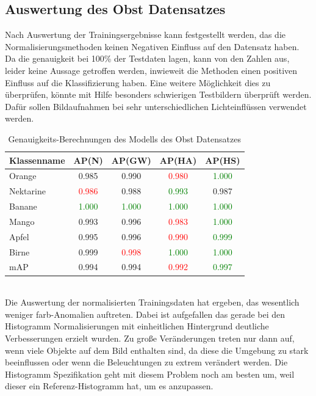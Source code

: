 \documentclass[a4paper,12pt,oneside]{article}
\begin{document}
\subsection{Auswertung des Obst Datensatzes}
Nach Auswertung der Trainingsergebnisse kann festgestellt werden, das die Normalisierungsmethoden keinen Negativen Einfluss auf den Datensatz haben. Da die genauigkeit bei 100\% der Testdaten lagen, kann von den Zahlen aus, leider keine Aussage getroffen werden, inwieweit die Methoden einen positiven Einfluss auf die Klassifizierung haben. Eine weitere Möglichkeit dies zu überprüfen, könnte mit Hilfe besonders schwierigen Testbildern überprüft werden. Dafür sollen Bildaufnahmen bei sehr unterschiedlichen Lichteinflüssen verwendet werden.
\begin{table}
[h]
\caption{Genauigkeits-Berechnungen des Modells des Obst Datensatzes}
\centering
\begin{tabular}{|l|c|c|c|c|}
\hline
Klassenname & AP(N) & AP(GW) & AP(HA) & AP(HS)\\
\hline
Orange & 0.985 & 0.990 & \textcolor{red}{0.980} & \textcolor{green}{1.000}\\
Nektarine & \textcolor{red}{0.986} & 0.988 & \textcolor{green}{0.993} & 0.987\\
Banane & \textcolor{green}{1.000} & \textcolor{green}{1.000} & \textcolor{green}{1.000} & \textcolor{green}{1.000}\\
Mango & 0.993 & 0.996 & \textcolor{red}{0.983} & \textcolor{green}{1.000}\\
Apfel & 0.995 & 0.996 & \textcolor{red}{0.990} & \textcolor{green}{0.999}\\
Birne & 0.999 & \textcolor{red}{0.998} & \textcolor{green}{1.000} & \textcolor{green}{1.000}\\
\hline
mAP & 0.994 & 0.994 & \textcolor{red}{0.992} & \textcolor{green}{0.997}\\
\hline
\end{tabular}
\end{table}\\
Die Auswertung der normalisierten Trainingsdaten hat ergeben, das wesentlich weniger farb-Anomalien auftreten. Dabei ist aufgefallen das gerade bei den Histogramm Normalisierungen mit einheitlichen Hintergrund deutliche Verbesserungen erzielt wurden. Zu große Veränderungen treten nur dann auf, wenn viele Objekte auf dem Bild enthalten sind, da diese die Umgebung zu stark beeinflussen oder wenn die Beleuchtungen zu extrem verändert werden. Die Histogramm Spezifikation geht mit diesem Problem noch am besten um, weil dieser ein Referenz-Histogramm hat, um es anzupassen. \\\\
\end{document}
